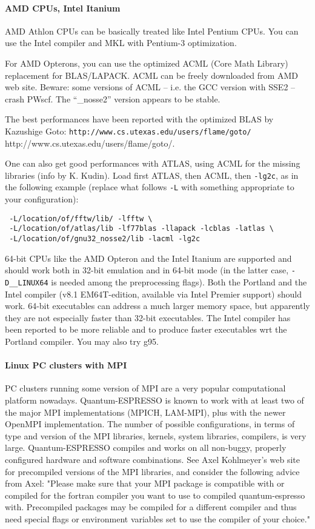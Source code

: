\documentclass[12pt,a4paper]{article}
\begin{document}
\paragraph{AMD CPUs, Intel Itanium}

AMD Athlon CPUs can be basically treated like Intel Pentium CPUs.
You can use the Intel compiler and MKL with Pentium-3 optimization.

For AMD Opterons, you can use the optimized ACML (Core Math Library)
replacement for BLAS/LAPACK. ACML can be freely downloaded from AMD 
web site. Beware: some versions of ACML -- i.e. the GCC version with 
SSE2 -- crash PWscf. The ``\_nosse2'' version appears to be stable. 

The best performances have been reported with the optimized BLAS 
by Kazushige Goto:
\htmladdnormallink%
{\texttt{http://www.cs.utexas.edu/users/flame/goto/}}%
{http://www.cs.utexas.edu/users/flame/goto/}.

One can also get good performances with ATLAS, using ACML for the
missing libraries (info by K. Kudin). Load first ATLAS, then ACML, 
then \texttt{-lg2c}, as in the following example (replace what 
follows \texttt{-L} with something appropriate to your configuration):
\begin{verbatim}
 -L/location/of/fftw/lib/ -lfftw \
 -L/location/of/atlas/lib -lf77blas -llapack -lcblas -latlas \
 -L/location/of/gnu32_nosse2/lib -lacml -lg2c
\end{verbatim}

64-bit CPUs like the AMD Opteron and the Intel Itanium are
supported and should work both in 32-bit emulation and in
64-bit mode (in the latter case, \texttt{-D\_\_LINUX64} is 
needed among the preprocessing flags). Both the Portland and the
Intel compiler (v8.1 EM64T-edition, available via Intel Premier 
support) should work. 64-bit executables can address a 
much larger memory space, but apparently they are not especially
faster than 32-bit executables. The Intel compiler has been 
reported to be more reliable and to produce faster executables 
wrt the Portland compiler. You may also try g95.

\paragraph{Linux PC clusters with MPI}

PC clusters running some version of MPI are a very popular 
computational platform nowadays. Quantum-ESPRESSO is known to work
with at least two of the major MPI implementations (MPICH, LAM-MPI), 
plus with the newer OpenMPI implementation. 
The number of possible configurations, in terms of type and version of 
the MPI libraries, kernels, system libraries, compilers, is very large. 
Quantum-ESPRESSO compiles and works on all non-buggy, properly configured 
hardware and software combinations. 
See Axel Kohlmeyer's web site for precompiled versions of the MPI libraries, 
and consider the following advice from Axel:
"Please make sure that your MPI package is compatible with or compiled
for the fortran compiler you want to use to compiled quantum-espresso with.
Precompiled packages may be compiled for a different compiler and thus
need special flags or environment variables set to use the compiler of
your choice."
\end{document}
